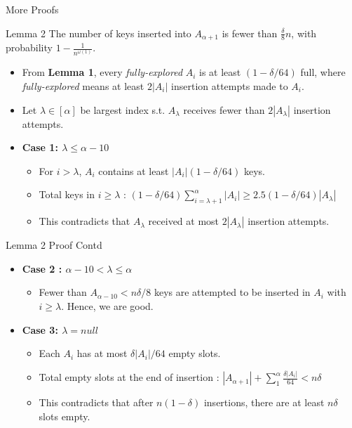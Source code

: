 \documentclass{beamer}
\begin{document}
\begin{frame}{More Proofs}
	\begin{block}{Lemma 2}
		The number of keys inserted into $A_{\alpha + 1}$ is fewer than $\frac{\delta}{8}n$, with probability $1 - \frac{1}{n^{\omega(1)}}$.
	\end{block}
\begin{itemize}
	\item From {\bf Lemma 1}, every {\em fully-explored} $A_i$ is at least $(1-\delta / 64)$ full, where {\em fully-explored} means at least $2|A_i|$ insertion attempts made to $A_i$.
	\item Let $\lambda \in [\alpha]$ be largest index s.t. $A_{\lambda}$ receives fewer than $2|A_{\lambda}|$ insertion attempts. 
	\item {\bf Case 1: $\lambda \le \alpha - 10$} 
	\begin{itemize}
		\item For $i>\lambda$, $A_i$ contains at least $|A_i|(1-\delta/64)$ keys. 
		\item Total keys in $i \ge \lambda$ : $(1-\delta/64) \sum_{i=\lambda+1}^{\alpha}|A_i| \ge 2.5(1-\delta/64)|A_{\lambda}|$
		\item This contradicts that $A_{\lambda}$ received at most $2|A_{\lambda}|$ insertion attempts.
	\end{itemize}  
\end{itemize}
\end{frame}

\begin{frame}{Lemma 2 Proof Contd}
	\begin{itemize}
		\item {\bf Case 2 : $\alpha -10 < \lambda \le \alpha$} 
		\begin{itemize}
			\item Fewer than $A_{\alpha -10} < n \delta/8$ keys are attempted to be inserted in $A_i$ with $i\ge \lambda$. Hence, we are good.
		\end{itemize}
	\item {\bf Case 3: $\lambda = null$} 
	\begin{itemize}
		\item Each $A_i$ has at most $\delta |A_i|/64$ empty slots.
		\item Total empty slots at the end of insertion : $|A_{\alpha+1}| + \sum_{1}^{\alpha}\frac{\delta|A_i|}{64} < n\delta$
		\item This contradicts that after $n(1-\delta)$ insertions, there are at least $n\delta$ slots empty.
	\end{itemize}
	\end{itemize}
\end{frame}
\end{document}
